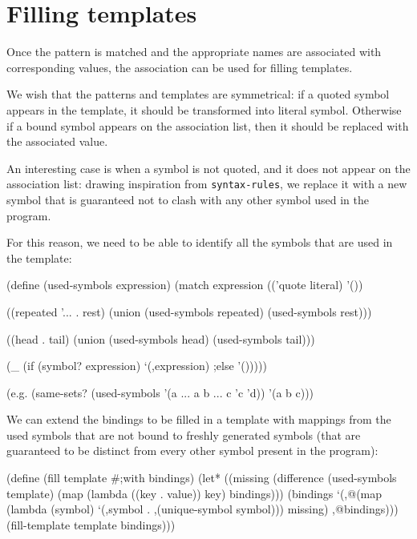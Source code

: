\section{Filling templates}

Once the pattern is matched and the appropriate names are associated
with corresponding values, the association can be used for filling
templates.

We wish that the patterns and templates are symmetrical: if a quoted
symbol appears in the template, it should be transformed into literal
symbol. Otherwise if a bound symbol appears on the association list,
then it should be replaced with the associated value.

An interesting case is when a symbol is not quoted, and it does not
appear on the association list: drawing inspiration from \texttt{syntax\--rules},
we replace it with a new symbol that is guaranteed not to clash with
any other symbol used in the program.

For this reason, we need to be able to identify all the symbols
that are used in the template:

\begin{Snippet}
  (define (used-symbols expression)
    (match expression
      (('quote literal)
       '())
\end{Snippet}
\begin{Snippet}
      ((repeated '... . rest)
       (union (used-symbols repeated)
	      (used-symbols rest)))
\end{Snippet}
\begin{Snippet}
      ((head . tail)
       (union (used-symbols head)
	      (used-symbols tail)))
\end{Snippet}
\begin{Snippet}
      (_ 
       (if (symbol? expression)
	   `(,expression)
       ;else
	   '()))))
\end{Snippet}

\begin{Snippet}
  (e.g. (same-sets? (used-symbols '(a ... a b ... c 'c 'd))
                    '(a b c)))
\end{Snippet}

We can extend the bindings to be filled in a template
with mappings from the used symbols that are not bound
to freshly generated symbols (that are guaranteed to be
distinct from every other symbol present in the program):

\begin{Snippet}
(define (fill template #;with bindings)
  (let* ((missing (difference (used-symbols template)
			      (map (lambda ((key . value))
				     key)
				   bindings)))
	 (bindings `(,@(map (lambda (symbol)
			      `(,symbol . ,(unique-symbol symbol)))
			    missing) ,@bindings)))
    (fill-template template bindings)))
\end{Snippet}

